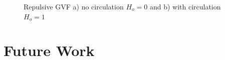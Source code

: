\documentclass[numbered,pdftex]{ohio-etd}
\begin{document}
\begin{figure}[H]
	\begin{subfigmatrix}{2}%
		\centering	
		\hspace*{0mm}
	\end{subfigmatrix}
	\caption{Repulsive GVF a) no circulation $H_o=0$ and b) with circulation $H_o=1$}
	\label{fig:decayApplied}
\end{figure} 

\chapter{Future Work}


   

\end{document}
